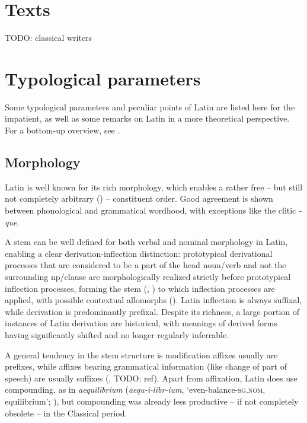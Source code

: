 \documentclass[a4paper, oneside, 12pt]{report}
\newcommand*{\citesec}[1]{\S~{#1}}
\newcommand{\form}[1]{\emph{#1}}
\newcommand*{\category}[1]{\textsc{#1}}
\newcommand{\translate}[1]{`#1'}
\begin{document}
\section{Texts}

TODO: classical writers

\section{Typological parameters}

Some typological parameters and peculiar points of Latin 
are listed here for the impatient,
as well as some remarks on Latin in a more theoretical perspective.
For a bottom-up overview, 
see .

\subsection{Morphology}

Latin is well known for its rich morphology,
which enables a rather free -- but still not completely arbitrary ()
-- constituent order.
Good agreement is shown between phonological and grammatical wordhood,
with exceptions like the clitic \form{-que}.

A stem can be well defined for both verbal and nominal morphology in Latin,
enabling a clear derivation-inflection distinction:
prototypical derivational processes that are considered 
to be a part of the head noun/verb 
and not the surrounding \acs{np}/clause
are morphologically realized strictly 
before prototypical inflection processes,
forming the stem 
(,
) to which 
inflection processes are applied,
with possible contextual allomorphs
(). 
Latin inflection is always suffixal,
while derivation is predominantly prefixal.
Despite its richness, 
a large portion of instances of Latin derivation are historical,
with meanings of derived forms 
having significantly shifted and no longer regularly inferrable.

A general tendency in the stem structure 
is modification affixes usually are prefixes,
while affixes bearing grammatical information 
(like change of part of speech) 
are usually suffixes
(, TODO: ref).
Apart from affixation,
Latin does use compounding, as in \form{aequilibrium} 
(\form{aequ-i-libr-ium}, \translate{even-balance-\category{sg.nom}, equilibrium};
\citealt[\citesec{92}]{smith2016greek}),
but compounding was already less productive -- if not completely obsolete --
in the Classical period.
\end{document}
